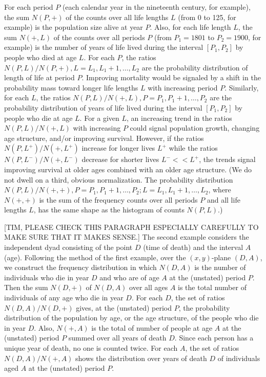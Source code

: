 \documentclass{bmcart}
\begin{document}
For each period $P$ (each calendar year in the nineteenth century, for example),
the sum $N(P,+)$ of the counts over all life lengths $L$ 
(from 0 to 125, for example) is the population size alive at year $P$.
Also, for each life length $L$,
the sum $N(+,L)$ of the counts over all periods $P$ (from $P_1=1801$ to $P_2=1900$, for example)
is the number of years of life lived during the interval $[P_1, P_2]$ by people who died at age $L$.
For each $P$, the ratios $N(P,L)/N(P,+), L=L_1, L_1+1, \ldots, L_2$ are 
the probability distribution of length of life at period $P$.
Improving mortality would be signaled by a shift in the probability mass toward longer life lengths $L$
with increasing period $P$.
Similarly, for each $L$, the ratios $N(P,L)/N(+,L), P=P_1, P_1+1, \ldots, P_2$ are the probability distribution of 
years of life lived during the interval $[P_1, P_2]$ by people who die at age $L$.
For a given $L$, an increasing trend in the ratios $N(P,L)/N(+,L)$ with increasing $P$ could
signal population growth, changing age structure, and/or improving survival.
However, if the ratios $N(P,L^+)/N(+,L^+)$ 
increase for longer lives $L^+$ 
while the ratios $N(P,L^-)/N(+,L^-)$ decrease for shorter lives $L^-<<L^+$,
the trends 
signal improving survival at older ages combined with an older age structure.
(We do not dwell on a third, obvious normalization. 
The probability distribution $N(P,L)/N(+,+), P=P_1, P_1+1, \ldots, P_2; L=L_1, L_1+1, \ldots, L_2$,
where $N(+,+)$ is the sum of the frequency counts over all periods $P$ and all life lengths $L$, 
has the same shape as the histogram of counts $N(P,L)$.)

[TIM, PLEASE CHECK THIS PARAGRAPH ESPECIALLY CAREFULLY TO MAKE SURE THAT IT MAKES SENSE.]
The second example considers the independent dyad consisting of the point $D$ (time of death)
and the interval $A$ (age).
Following the method of the first example, over the $(x,y)$-plane $(D,A)$, we construct the frequency distribution in which
$N(D,A)$ is the number of individuals who die in year $D$ and who are of age $A$
at the (unstated) period $P$.
Then the sum $N(D,+)$ of $N(D,A)$ over all ages $A$ is the total number of individuals of any age
who die in year $D$.
For each $D$, the set of ratios $N(D,A)/N(D,+)$ gives,
at the (unstated) period $P$,
the probability distribution of the population by age, or the age structure,
of the people who die in year $D$.
Also, $N(+,A)$ is the total of number of people at age $A$ at the (unstated) period $P$ summed over all years of death $D$.
Since each person has a unique year of death, no one is counted twice. 
For each $A$, the set of ratios $N(D,A)/N(+,A)$ shows the distribution over years of death $D$ of individuals aged $A$ at the (unstated) period $P$.
\end{document}
